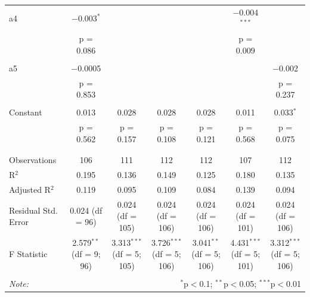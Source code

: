 \begin{table}[!htbp]
\begin{tabular}{@{\extracolsep{5pt}}lcccccc}
 a4 & $-$0.003$^{*}$ &  &  &  & $-$0.004$^{***}$ &  \\ 
  & p = 0.086 &  &  &  & p = 0.009 &  \\ 
  & & & & & & \\ 
 a5 & $-$0.0005 &  &  &  &  & $-$0.002 \\ 
  & p = 0.853 &  &  &  &  & p = 0.237 \\ 
  & & & & & & \\ 
 Constant & 0.013 & 0.028 & 0.028 & 0.028 & 0.011 & 0.033$^{*}$ \\ 
  & p = 0.562 & p = 0.157 & p = 0.108 & p = 0.121 & p = 0.568 & p = 0.075 \\ 
  & & & & & & \\ 
\hline \\[-1.8ex] 
Observations & 106 & 111 & 112 & 112 & 107 & 112 \\ 
R$^{2}$ & 0.195 & 0.136 & 0.149 & 0.125 & 0.180 & 0.135 \\ 
Adjusted R$^{2}$ & 0.119 & 0.095 & 0.109 & 0.084 & 0.139 & 0.094 \\ 
Residual Std. Error & 0.024 (df = 96) & 0.024 (df = 105) & 0.024 (df = 106) & 0.024 (df = 106) & 0.024 (df = 101) & 0.024 (df = 106) \\ 
F Statistic & 2.579$^{**}$ (df = 9; 96) & 3.313$^{***}$ (df = 5; 105) & 3.726$^{***}$ (df = 5; 106) & 3.041$^{**}$ (df = 5; 106) & 4.431$^{***}$ (df = 5; 101) & 3.312$^{***}$ (df = 5; 106) \\ 
\hline 
\hline \\[-1.8ex] 
\textit{Note:}  & \multicolumn{6}{r}{$^{*}$p$<$0.1; $^{**}$p$<$0.05; $^{***}$p$<$0.01} \\ 
\end{tabular} 
\end{table}



